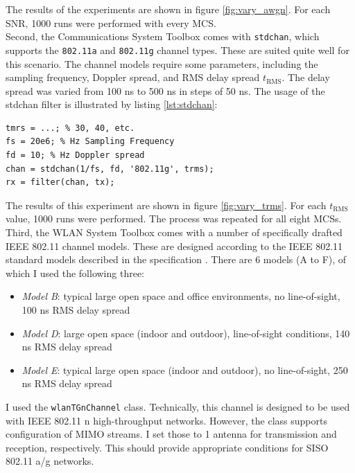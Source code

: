 The results of the experiments are shown in figure \ref{fig:vary_awgn}. For each \gls{SNR}, 1000 runs were performed with every \gls{MCS}.\\

Second, the Communications System Toolbox comes with \texttt{stdchan}, which supports the \texttt{802.11a} and \texttt{802.11g} channel types. These are suited quite well for this scenario. The channel models require some parameters, including the sampling frequency, Doppler spread, and \gls{RMS} delay spread $ t_{\text{RMS}} $. The delay spread was varied from 100 ns to 500 ns in steps of 50 ns. The usage of the stdchan filter is illustrated by listing \ref{lst:stdchan}:

\begin{lstlisting}[captionpos=b,caption={Matlab stdchan Channel Model},label=lst:stdchan]
tmrs = ...; % 30, 40, etc.
fs = 20e6; % Hz Sampling Frequency
fd = 10; % Hz Doppler spread
chan = stdchan(1/fs, fd, '802.11g', trms);
rx = filter(chan, tx);
\end{lstlisting}

The results of this experiment are shown in figure \ref{fig:vary_trms}. For each $ t_{\text{RMS}} $ value, 1000 runs were performed. The process was repeated for all eight \glspl{MCS}.\\

Third, the WLAN System Toolbox comes with a number of specifically drafted IEEE 802.11 channel models. These are designed according to the IEEE 802.11 standard models described in the specification \cite{ieee2012}. There are 6 models (A to F), of which I used the following three:

\begin{itemize}
	\item \textit{Model B}: typical large open space and office environments, no line-of-sight, 100 ns \gls{RMS} delay spread
	\item \textit{Model D}: large open space (indoor and outdoor), line-of-sight conditions, 140 ns \gls{RMS} delay spread
	\item \textit{Model E}: typical large open space (indoor and outdoor), no line-of-sight, 250 ns \gls{RMS} delay spread
\end{itemize}

I used the \texttt{wlanTGnChannel} class. Technically, this channel is designed to be used with IEEE 802.11 n high-throughput networks. However, the class supports configuration of \gls{MIMO} streams. I set those to 1 antenna for transmission and reception, respectively. This should provide appropriate conditions for \gls{SISO} 802.11 a/g networks.

